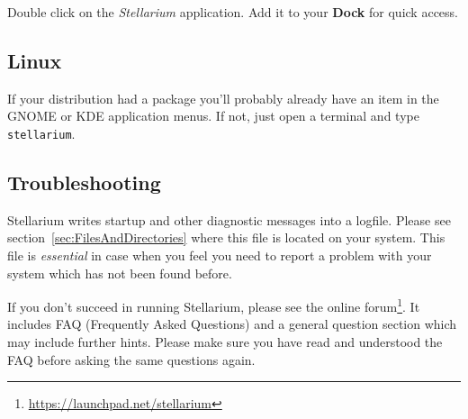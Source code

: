 Double click on the \emph{Stellarium} application.  Add it to your
\textbf{Dock} for quick access.

\subsection{Linux}
\label{sec:GettingStarted:Running:Linux}

If your distribution had a package you'll probably already have an
item in the GNOME or KDE application menus. If not, just open a
terminal and type \texttt{stellarium}.


\subsection{Troubleshooting}
\label{sec:GettingStarted:Running:Troubleshooting}

Stellarium writes startup and other diagnostic messages into a
logfile. Please see section~\ref{sec:FilesAndDirectories} where this
file is located on your system. This file is \emph{essential} in case when
you feel you need to report a problem with your system which has not
been found before.

If you don't succeed in running Stellarium, please see the online
forum\footnote{\url{https://launchpad.net/stellarium}}.  It includes
FAQ (Frequently Asked Questions) and a general question
section which may include further hints. Please make sure you have
read and understood the FAQ before asking the same questions again.


